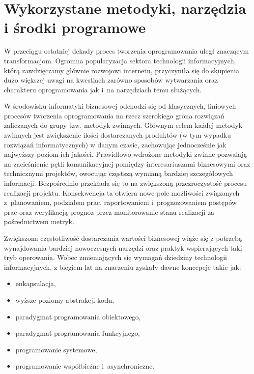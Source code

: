 \section{Wykorzystane metodyki, narzędzia i środki programowe}\label{ss_internals-technologies}
W przeciągu ostatniej dekady proces tworzenia oprogramowania uległ znaczącym
transformacjom.
Ogromna popularyzacja sektora technologii informacyjnych, którą zawdzięczamy głównie rozwojowi internetu, przyczyniła się do skupienia dużo większej uwagi na kwestiach zarówno sposobów wytwarzania oraz charakteru oprogramowania jak i~na narzędziach temu służących.

W środowisku informatyki biznesowej odchodzi się od klasycznych, liniowych procesów tworzenia oprogramowania na rzecz szerokiego grona rozwiązań zaliczanych do grupy tzw. metodyk zwinnych. 
Głównym celem każdej metodyk zwinnych jest zwiększenie ilości dostarczanych produktów (w tym wypadku rozwiązań informatycznych) w danym czasie, zachowując jednocześnie jak najwyższy poziom ich jakości.
Prawidłowo wdrożone metodyki zwinne pozwalają na zacieśnienie pętli komunikacyjnej pomiędzy interesariuszami biznesowymi oraz technicznymi projektów, owocując częstszą wymianą bardziej szczegółowych informacji.
Bezpośrednio przekłada się to na zwiększoną przezroczystość procesu realizacji projektu.
Konsekwencja ta otwiera nowe pole możliwości związanych z~planowaniem, podziałem prac, raportowaniem i~prognozowaniem postępów prac oraz weryfikacją prognoz przez monitorowanie stanu realizacji za pośrednictwem metryk.

\par{
Zwiększona częstotliwość dostarczania wartości biznesowej wiąże się z potrzebą wynajdowania bardziej nowoczesnych narzędzi oraz praktyk wspierających taki tryb operowania.
Wobec zmieniających się wymagań dziedziny technologii informacyjnych, z biegiem lat na znaczeniu zyskały dawne koncepcje takie jak:

\begin{itemize}
  \item enkapsulacja,
  \item wyższe poziomy abstrakcji kodu,
  \item paradygmat programowania obiektowego,
  \item paradygmat programowania funkcyjnego,
  \item programowanie systemowe,
  \item programowanie współbieżne i~asynchroniczne.
\end{itemize}
}

